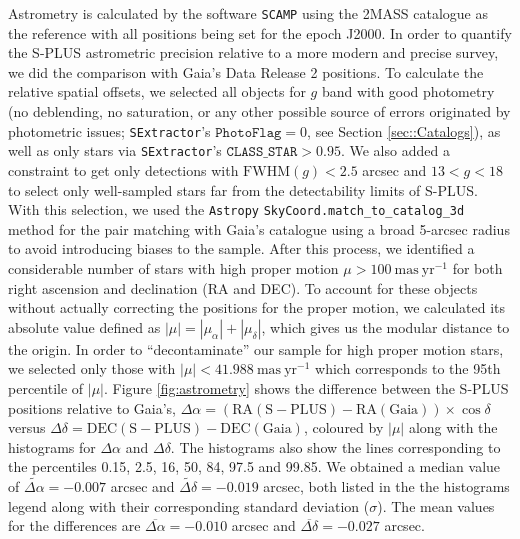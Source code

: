 \documentclass[fleqn,usenatbib]{mnras}
\begin{document}
Astrometry is calculated by the software \texttt{SCAMP} \citep{SCAMP2006ASPC..351..112B} using the 2MASS catalogue as the reference with all positions being set for the epoch J2000. In order to quantify the S-PLUS astrometric precision relative to a more modern and precise survey, we did the comparison with Gaia's Data Release 2 positions. To calculate the relative spatial offsets, we selected all objects for $g$ band with good photometry (no deblending, no saturation, or any other possible source of errors originated by photometric issues; \texttt{SExtractor}'s $\texttt{PhotoFlag} = 0$, see Section \ref{sec::Catalogs}), as well as only stars via \texttt{SExtractor}'s $\texttt{CLASS\_STAR} > 0.95$. We also added a constraint to get only detections with $\mathrm{FWHM}(g) < 2.5$ arcsec and $13 < g < 18$ to select only well-sampled stars far from the detectability limits of S-PLUS. With this selection, we used the \texttt{Astropy} \texttt{SkyCoord.match\_to\_catalog\_3d} method \citep{2013A&A...558A..33A,2018AJ....156..123A} for the pair matching with Gaia's catalogue using a broad 5-arcsec radius to avoid introducing biases to the sample. After this process, we identified a considerable number of stars with high proper motion $\mu > 100~\mathrm{mas~yr^{-1}}$ for both right ascension and declination (RA and DEC). To account for these objects without actually correcting the positions for the proper motion, we calculated its absolute value defined as $|\mu| = |\mu_\alpha| + |\mu_\delta|$, which gives us the modular distance to the origin. In order to ``decontaminate'' our sample for high proper motion stars, we selected only those with $|\mu| < 41.988~\mathrm{mas~yr^{-1}}$ which corresponds to the 95th percentile of $|\mu|$. Figure \ref{fig:astrometry} shows the difference between the S-PLUS positions relative to Gaia's, $\Delta\alpha = (\mathrm{RA(S-PLUS) - RA(Gaia)}) \times \cos \delta$ versus $\Delta\delta = \mathrm{DEC(S-PLUS) - DEC(Gaia)}$, coloured by $|\mu|$ along with the histograms for $\Delta\alpha$ and $\Delta\delta$. The histograms also show the lines corresponding to the percentiles 0.15, 2.5, 16, 50, 84, 97.5 and 99.85. We obtained a median value of $\widetilde{\Delta\alpha} = -0.007$ arcsec and $\widetilde{\Delta\delta} = -0.019$ arcsec, both listed in the the histograms legend along with their corresponding standard deviation ($\sigma$). The mean values for the differences are $\overline{\Delta\alpha} = -0.010$ arcsec and $\overline{\Delta\delta} = -0.027$ arcsec. 
\end{document}

